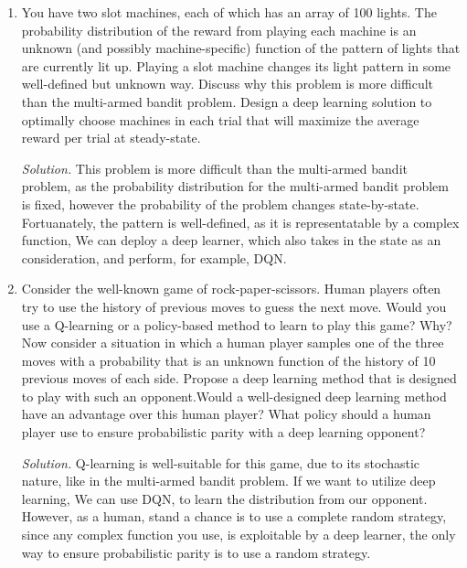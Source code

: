 \documentclass[12pt]{article}
\newcommand\sol[1] {
    \begin{mdframed}
        \emph{Solution.} #1
    \end{mdframed}
}
\begin{document}
\begin{enumerate}[ref=\theenumi]
{            can have more complex representation and usually perform better than traditional 
            shallow models.
        }
    \item You have two slot machines, each of which has an array of 100 lights. The probability
            distribution of the reward from playing each machine is an unknown (and possibly
            machine-specific) function of the pattern of lights that are currently lit up. Playing a
            slot machine changes its light pattern in some well-defined but unknown way. Discuss
            why this problem is more difficult than the multi-armed bandit problem. Design a
            deep learning solution to optimally choose machines in each trial that will maximize
            the average reward per trial at steady-state.
        \sol {
            This problem is more difficult than the multi-armed bandit problem, as the probability
            distribution for the multi-armed bandit problem is fixed, however the probability
            of the problem changes state-by-state. \\
            Fortuanately, the pattern is well-defined, as it is representatable by a complex function,
            We can deploy a deep learner, which also takes in the state as an consideration,
            and perform, for example, DQN.
        }
    \item Consider the well-known game of rock-paper-scissors. Human players often try to use
            the history of previous moves to guess the next move. Would you use a Q-learning or
            a policy-based method to learn to play this game? Why? Now consider a situation in
            which a human player samples one of the three moves with a probability that is an
            unknown function of the history of 10 previous moves of each side. Propose a deep
            learning method that is designed to play with such an opponent.Would a well-designed
            deep learning method have an advantage over this human player? What policy should
            a human player use to ensure probabilistic parity with a deep learning opponent?
        \sol {
            Q-learning is well-suitable for this game, due to its stochastic nature, like in the
            multi-armed bandit problem. If we want to utilize deep learning, We can use DQN, to 
            learn the distribution from our opponent. \\
            However, as a human, stand a chance is to use a complete random strategy, since
            any complex function you use, is exploitable by a deep learner, the only way
            to ensure probabilistic parity is to use a random strategy.
        }
\end{enumerate}
\end{document}
